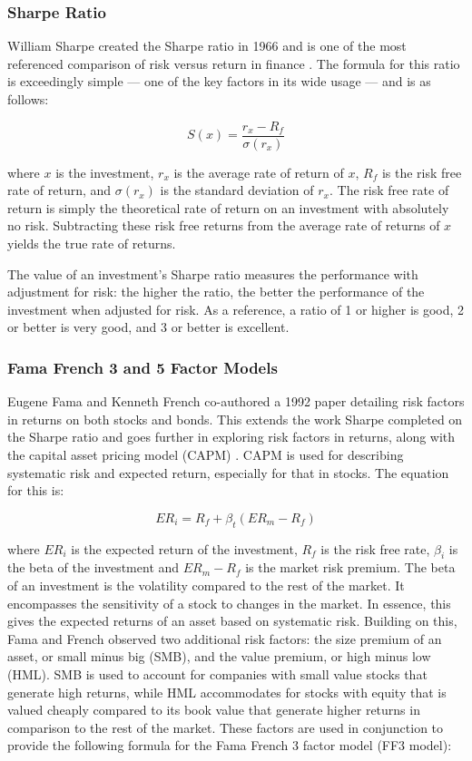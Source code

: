 \subsubsection{Sharpe Ratio}
\label{ssub:sharpe-ratio}
William Sharpe created the Sharpe ratio in 1966 and is one of the most referenced comparison of risk versus return in finance \parencite{sharpe-ratio}. The formula for this ratio is exceedingly simple --- one of the key factors in its wide usage --- and is as follows:

\begin{equation*}
S(x) = \frac{r_x - R_f}{\sigma(r_x)}
\end{equation*}

\noindent
where $x$ is the investment, $r_x$ is the average rate of return of $x$, $R_f$ is the risk free rate of return, and $\sigma(r_x)$ is the standard deviation of $r_x$. The risk free rate of return is simply the theoretical rate of return on an investment with absolutely no risk. Subtracting these risk free returns from the average rate of returns of $x$ yields the true rate of returns.

The value of an investment's Sharpe ratio measures the performance with adjustment for risk: the higher the ratio, the better the performance of the investment when adjusted for risk. As a reference, a ratio of 1 or higher is good, 2 or better is very good, and 3 or better is excellent. 

\subsubsection{Fama French 3 and 5 Factor Models}
\label{ssub:fama-french}
Eugene Fama and Kenneth French co-authored a 1992 paper detailing risk factors in returns on both stocks and bonds. This extends the work Sharpe completed on the Sharpe ratio and goes further in exploring risk factors in returns, along with the capital asset pricing model (CAPM) \parencite{ff3}. CAPM is used for describing systematic risk and expected return, especially for that in stocks. The equation for this is:

\begin{equation}
ER_i = R_f + \beta_t (ER_m - R_f)
\end{equation}

\noindent
where $ER_i$ is the expected return of the investment, $R_f$ is the risk free rate, $\beta_i$ is the beta of the investment and $ER_m - R_f$ is the market risk premium. The beta of an investment is the volatility compared to the rest of the market. It encompasses the sensitivity of a stock to changes in the market. In essence, this gives the expected returns of an asset based on systematic risk. Building on this, Fama and French observed two additional risk factors: the size premium of an asset, or small minus big (SMB), and the value premium, or high minus low (HML). SMB is used to account for companies with small value stocks that generate high returns, while HML accommodates for stocks with equity that is valued cheaply compared to its book value that generate higher returns in comparison to the rest of the market. These factors are used in conjunction to provide the following formula for the Fama French 3 factor model (FF3 model):


